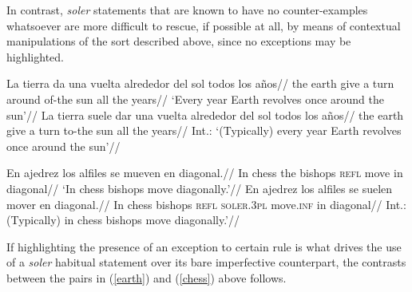 \documentclass{cascadilla-xelatex-biblatex}
\begin{document}
	In contrast, \textit{soler} statements that are known to have no counter-examples whatsoever are more difficult to rescue, if possible at all, by means of contextual manipulations of the sort described above, since no exceptions may be highlighted.
	
	\pex\label{earth}
	\a\begingl
	\gla La tierra da una vuelta alrededor del sol todos los a{\~n}os//
	\glb the earth give a turn around of-the sun all the years//
	\glft `Every year Earth revolves once around the sun'//
	\endgl
	\a\begingl
	\gla\ljudge{\#}La tierra suele dar una vuelta alrededor del sol todos los a{\~n}os//
	\glb the earth give a turn to-the sun all the years//
	\glft Int.: `(Typically) every year Earth revolves once around the sun'//
	\endgl
	\xe
	
	\pex\label{chess}
	\a\begingl
	\gla En ajedrez los alfiles se mueven en diagonal.//
	\glb In chess the bishops \textsc{refl} move in diagonal//
	\glft `In chess bishops move diagonally.'//
	\endgl
	\a\begingl
	\gla\ljudge{\#}En ajedrez los alfiles se suelen mover en diagonal.//
	\glb In chess bishops \textsc{refl} \textsc{soler.3pl} move.\textsc{inf} in diagonal//
	\glft Int.: (Typically) in chess bishops move diagonally.'//
	\endgl
	\xe
	
	If highlighting the presence of an exception to certain rule is what drives the use of a \textit{soler} habitual statement over its bare imperfective counterpart, the contrasts between the pairs in (\ref{earth}) and (\ref{chess}) above follows. 
	
	
	\printbibliography
\end{document}
